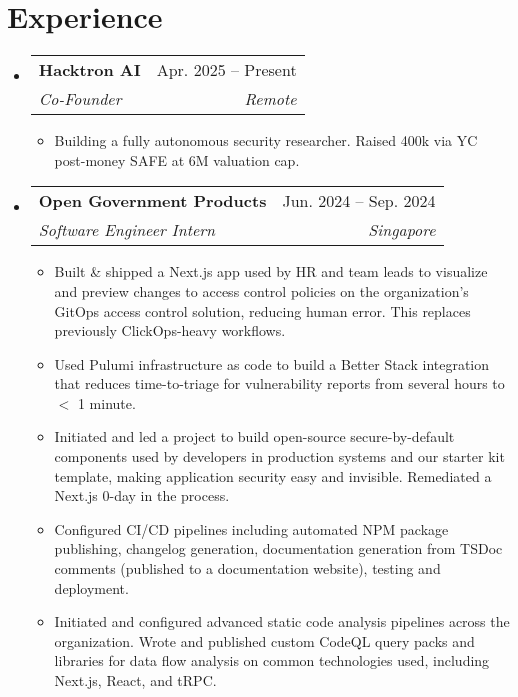 \documentclass[letterpaper,10pt]{article}
\makeatletter
\newcommand{\resumeItem}[1]{
  \item\small{
    {#1 \vspace{-2pt}}
  }
}
\newcommand{\resumeSubheading}[4]{
  \vspace{-2pt}\item
  \begin{tabular*}{0.97\textwidth}[t]{l@{\extracolsep{\fill}}r}
    \textbf{#1} & #2 \\
    \textit{\small#3} & \textit{\small #4} \\
  \end{tabular*}\vspace{-7pt}
}
\newenvironment{resumeSubHeadingList}{\begin{itemize}[leftmargin=0.15in, label={}]}{\end{itemize}}
\newenvironment{resumeItemList}{\begin{itemize}}{\end{itemize}}
\makeatother
\begin{document}
\section{Experience}
\begin{resumeSubHeadingList}

  \resumeSubheading
    {Hacktron AI}{Apr. 2025 -- Present}
    {Co-Founder}{Remote}
    \begin{resumeItemList}
      \resumeItem{Building a fully autonomous security researcher. Raised
                  \EurCr400k via YC post-money SAFE at \EurCr6M valuation cap.}
    \end{resumeItemList}
    \vspace{2pt}

  \resumeSubheading
    {Open Government Products}{Jun. 2024 -- Sep. 2024}
    {Software Engineer Intern}{Singapore}
    \begin{resumeItemList}
      \resumeItem{Built \& shipped a Next.js app used by HR and team leads to
                  visualize and preview changes to access control policies on
                  the organization's GitOps access control solution, reducing
                  human error. This replaces previously ClickOps-heavy
                  workflows.}
      \resumeItem{Used Pulumi infrastructure as code to build a Better Stack
                  integration that reduces time-to-triage for vulnerability
                  reports from several hours to $<$ 1 minute.}
      \resumeItem{Initiated and led a project to build open-source
                  secure-by-default components used by developers in production
                  systems and our starter kit template, making application
                  security easy and invisible. Remediated a Next.js 0-day in
                  the process. }
      \resumeItem{Configured CI/CD pipelines including automated NPM package
                  publishing, changelog generation, documentation generation
                  from TSDoc comments (published to a documentation website),
                  testing and deployment.}
      \resumeItem{Initiated and configured advanced static code analysis
                  pipelines across the organization. Wrote and published custom
                  CodeQL query packs and libraries for data flow analysis on
                  common technologies used, including Next.js, React, and
                  tRPC.}
    \end{resumeItemList}


\end{resumeSubHeadingList}
\end{document}
